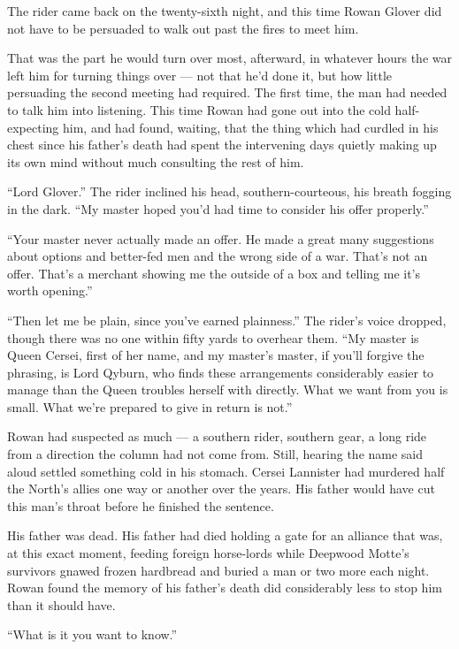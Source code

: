 The rider came back on the twenty-sixth night, and this time Rowan Glover did not have to be persuaded to walk out past the fires to meet him.

That was the part he would turn over most, afterward, in whatever hours the war left him for turning things over — not that he’d done it, but how little persuading the second meeting had required. The first time, the man had needed to talk him into listening. This time Rowan had gone out into the cold half-expecting him, and had found, waiting, that the thing which had curdled in his chest since his father’s death had spent the intervening days quietly making up its own mind without much consulting the rest of him.

“Lord Glover.” The rider inclined his head, southern-courteous, his breath fogging in the dark. “My master hoped you’d had time to consider his offer properly.”

“Your master never actually made an offer. He made a great many suggestions about options and better-fed men and the wrong side of a war. That’s not an offer. That’s a merchant showing me the outside of a box and telling me it’s worth opening.”

“Then let me be plain, since you’ve earned plainness.” The rider’s voice dropped, though there was no one within fifty yards to overhear them. “My master is Queen Cersei, first of her name, and my master’s master, if you’ll forgive the phrasing, is Lord Qyburn, who finds these arrangements considerably easier to manage than the Queen troubles herself with directly. What we want from you is small. What we’re prepared to give in return is not.”

Rowan had suspected as much — a southern rider, southern gear, a long ride from a direction the column had not come from. Still, hearing the name said aloud settled something cold in his stomach. Cersei Lannister had murdered half the North’s allies one way or another over the years. His father would have cut this man’s throat before he finished the sentence.

His father was dead. His father had died holding a gate for an alliance that was, at this exact moment, feeding foreign horse-lords while Deepwood Motte’s survivors gnawed frozen hardbread and buried a man or two more each night. Rowan found the memory of his father’s death did considerably less to stop him than it should have.

“What is it you want to know.”

\sceneBreak

